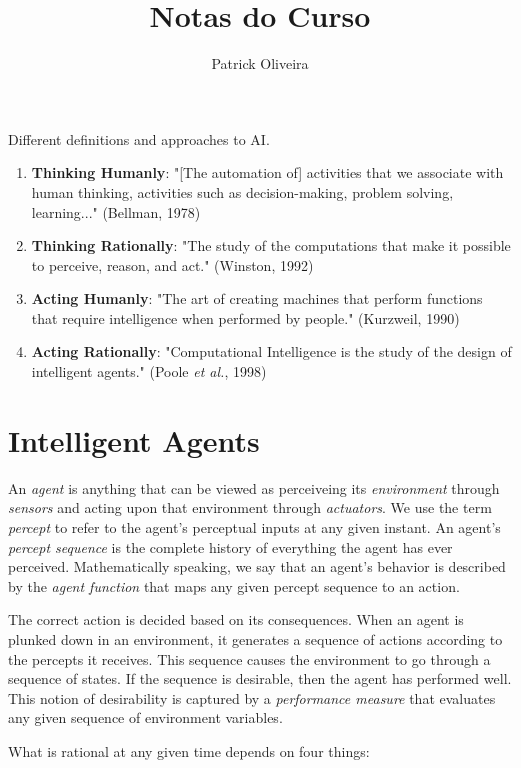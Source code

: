 \documentclass{article}
\title{Notas do Curso}
\author{Patrick Oliveira}
\affil{Curso ministrado pelo Prof. Denis Fantinato, 3Q19. As notas envolvem anotações de aula e recortes de livros e artigos.}
\begin{document}
\maketitle


Different definitions and approaches to AI.

\begin{enumerate}
    \item \textbf{Thinking Humanly}: "[The automation of] activities that we associate with human thinking, activities such as decision-making, problem solving, learning..." (Bellman, 1978)
    \item \textbf{Thinking Rationally}: "The study of the computations that make it possible to perceive, reason, and act." (Winston, 1992)
    \item \textbf{Acting Humanly}: "The art of creating machines that perform functions that require intelligence when performed by people." (Kurzweil, 1990)
    \item \textbf{Acting Rationally}: "Computational Intelligence is the study of the design of intelligent agents." (Poole \textit{et al.}, 1998)
\end{enumerate}

\section{Intelligent Agents}

An \textit{agent} is anything that can be viewed as perceiveing its \textit{environment} through \textit{sensors} and acting upon that environment through \textit{actuators}. We use the term \textit{percept} to refer to the agent's perceptual inputs at any given instant. An agent's \textit{percept sequence} is the complete history of everything the agent has ever perceived. Mathematically speaking, we say that an agent's behavior is described by the \textit{agent function} that maps any given percept sequence to an action.

The correct action is decided based on its consequences. When an agent is plunked down in an environment, it generates a sequence of actions according to the percepts it receives. This sequence causes the environment to go through a sequence of states. If the sequence is desirable, then the agent has performed well. This notion of desirability is captured by a \textit{performance measure} that evaluates any given sequence of environment variables.

What is rational at any given time depends on four things:
\end{document}
